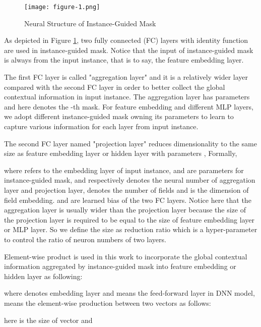\documentclass[sigconf]{acmart}
\begin{document}
\begin{figure}[!]
  \setlength{\abovecaptionskip}{1pt}
  \texttt{[image: figure-1.png]}
  \caption{Neural Structure of Instance-Guided Mask}
  \label{Fig.Instance-Guided}
\end{figure}

 As depicted in Figure \ref{Fig.Instance-Guided}, two fully connected (FC) layers with identity function are used in instance-guided mask. Notice that the input of instance-guided mask is always from the input instance, that is to say, the feature embedding layer.



 The first FC layer is called "aggregation layer" and it is a relatively wider layer compared with the second FC layer in order to better collect the global  contextual information in input instance. The aggregation layer has parameters  and here  denotes the -th mask. For feature embedding and different MLP layers, we adopt different instance-guided mask owning its parameters to learn to capture various information for each layer from input instance.



The second FC layer named "projection layer" reduces dimensionality to the same size as feature embedding layer  or hidden layer  with parameters , Formally,

where  refers to the embedding layer of input instance,  and  are parameters for instance-guided mask,  and  respectively denotes the neural number of aggregation layer and projection layer,  denotes the number of fields and  is the dimension of field embedding.  and  are learned bias of the two FC layers. Notice here that the aggregation layer is usually wider than the projection layer because the size of the projection layer is required to be equal to the size of feature embedding layer or MLP layer. So we define the size  as reduction ratio which is a hyper-parameter to control the ratio of neuron numbers of two layers.


Element-wise product is used in this work to incorporate the global contextual information aggregated by instance-guided mask into feature embedding or hidden layer as following:

where  denotes embedding layer and  means the feed-forward layer in DNN model,  means the element-wise production between two vectors as follows:

here  is the size of vector  and 
\end{document}
